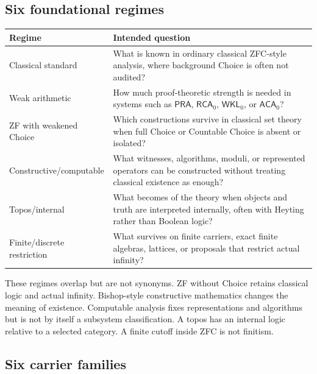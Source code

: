 \documentclass[11pt]{article}
\theoremstyle{definition}
\theoremstyle{remark}
\newcommand{\RCA}{\mathsf{RCA}_{0}}
\newcommand{\WKL}{\mathsf{WKL}_{0}}
\newcommand{\ACA}{\mathsf{ACA}_{0}}
\newcommand{\PRA}{\mathsf{PRA}}
\begin{document}
\subsection{Six foundational regimes}

\begin{center}
\small
\begin{tabularx}{\textwidth}{@{}Z Y@{}}
\toprule
Regime & Intended question \\
\midrule
Classical standard & What is known in ordinary classical ZFC-style analysis,
where background Choice is often not audited? \\
Weak arithmetic & How much proof-theoretic strength is needed in systems such
as \(\PRA\), \(\RCA\), \(\WKL\), or \(\ACA\)? \\
ZF with weakened Choice & Which constructions survive in classical set theory
when full Choice or Countable Choice is absent or isolated? \\
Constructive/computable & What witnesses, algorithms, moduli, or represented
operators can be constructed without treating classical existence as enough? \\
Topos/internal & What becomes of the theory when objects and truth are
interpreted internally, often with Heyting rather than Boolean logic? \\
Finite/discrete restriction & What survives on finite carriers, exact finite
algebras, lattices, or proposals that restrict actual infinity? \\
\bottomrule
\end{tabularx}
\end{center}

These regimes overlap but are not synonyms.  ZF without Choice retains
classical logic and actual infinity.  Bishop-style constructive mathematics
changes the meaning of existence.  Computable analysis fixes representations
and algorithms but is not by itself a subsystem classification.  A topos has
an internal logic relative to a selected category.  A finite cutoff inside
ZFC is not finitism.

\subsection{Six carrier families}
\end{document}
